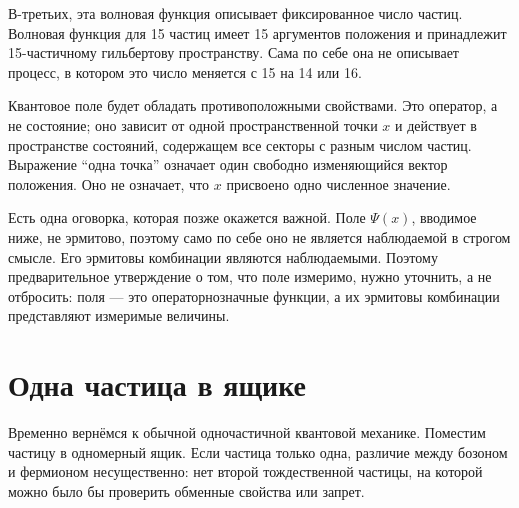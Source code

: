 В-третьих, эта волновая функция описывает фиксированное число частиц. Волновая функция для 15 частиц имеет 15 аргументов положения и принадлежит 15-частичному гильбертову пространству. Сама по себе она не описывает процесс, в котором это число меняется с 15 на 14 или 16.

Квантовое поле будет обладать противоположными свойствами. Это оператор, а не состояние; оно зависит от одной пространственной точки \(x\) и действует в пространстве состояний, содержащем все секторы с разным числом частиц. Выражение ``одна точка'' означает один свободно изменяющийся вектор положения. Оно не означает, что \(x\) присвоено одно численное значение.

Есть одна оговорка, которая позже окажется важной. Поле \(\Psi(x)\), вводимое ниже, не эрмитово, поэтому само по себе оно не является наблюдаемой в строгом смысле. Его эрмитовы комбинации являются наблюдаемыми. Поэтому предварительное утверждение о том, что поле измеримо, нужно уточнить, а не отбросить: поля — это операторнозначные функции, а их эрмитовы комбинации представляют измеримые величины.

\begin{classroomqa}
\end{classroomqa}

\begin{classroomqa}
\end{classroomqa}

\section{Одна частица в ящике}

Временно вернёмся к обычной одночастичной квантовой механике. Поместим частицу в одномерный ящик. Если частица только одна, различие между бозоном и фермионом несущественно: нет второй тождественной частицы, на которой можно было бы проверить обменные свойства или запрет.

